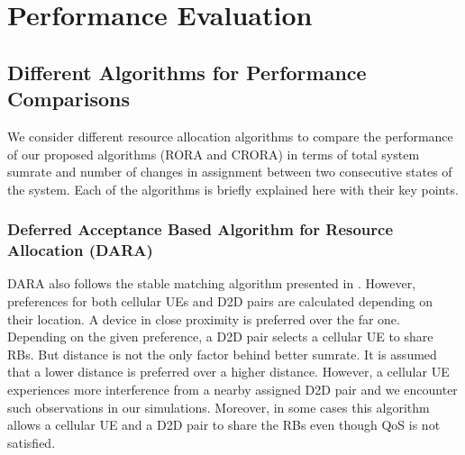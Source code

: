 \documentclass[times]{dacauth}
\begin{document}
\section{Performance Evaluation}\label{section:Performation Evaluation}
\subsection{Different Algorithms for Performance Comparisons}
\noindent
We consider different resource allocation algorithms to compare the performance of our proposed algorithms (RORA and CRORA) in terms of total system sumrate and number of changes in assignment between two consecutive states of the system. Each of the algorithms is briefly explained here with their key points.

\subsubsection{Deferred Acceptance Based Algorithm for Resource Allocation (DARA)}
\noindent
DARA \cite{dara} also follows the stable matching algorithm presented in \cite{stable}. However, preferences for both cellular UEs and D2D pairs are calculated depending on their location. A device in close proximity is preferred over the far one. Depending on the given preference, a D2D pair selects a cellular UE to share RBs. But distance is not the only factor behind better sumrate. It is assumed that a lower distance is preferred over a higher distance. However, a cellular UE experiences more interference from a nearby assigned D2D pair and we encounter such observations in our simulations. Moreover, in some cases this algorithm allows a cellular UE and a D2D pair to share the RBs even though QoS is not satisfied.

\end{document}
